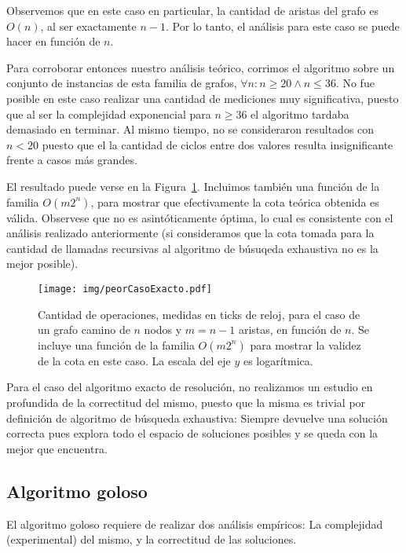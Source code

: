 Observemos que en este caso en particular, la cantidad de aristas del 
grafo es $O(n)$, al ser exactamente $n-1$. Por lo tanto, el an\'alisis
para este caso se puede hacer en funci\'on de $n$.

Para corroborar entonces nuestro an\'alisis te\'orico, corrimos el 
algoritmo sobre un conjunto de instancias de esta familia de grafos, 
$\forall n : n \geq 20 \wedge n \leq 36$.  
No fue posible en este caso realizar una cantidad de 
mediciones muy significativa, puesto que al ser la complejidad 
exponencial para $n \geq 36$ el algoritmo tardaba demasiado en terminar.
Al mismo tiempo, no se consideraron resultados con $n < 20$ puesto que 
el la cantidad de ciclos entre dos valores resulta insignificante 
frente a casos m\'as grandes.

El resultado puede verse en la Figura~\ref{fig::peorCasoExacto}. 
Incluimos tambi\'en una funci\'on de la familia $O(m2^n)$, para 
mostrar que efectivamente la cota te\'orica obtenida es v\'alida. 
Observese que no es asint\'oticamente \'optima, lo cual es consistente
con el an\'alisis realizado anteriormente (si consideramos que la 
cota tomada para la cantidad de llamadas recursivas al algoritmo de 
b\'usuqeda exhaustiva no es la mejor posible).

\begin{figure}[H]
	\caption{Cantidad de operaciones, medidas en ticks de reloj, 
	para el caso de un grafo camino de $n$ nodos y 
	$m = n-1$ aristas, en funci\'on de $n$. Se incluye una funci\'on
	de la familia $O(m2^n)$ para mostrar la validez de la cota en este caso.
	La escala del eje $y$ es logar\'itmica.}
	\label{fig::peorCasoExacto}
	\centering
	\texttt{[image: img/peorCasoExacto.pdf]}
\end{figure} 

Para el caso del algoritmo exacto de resoluci\'on, no realizamos un 
estudio en profundida de la correctitud del mismo, puesto que la misma
es trivial por definici\'on de algoritmo de b\'usqueda exhaustiva: 
Siempre devuelve una soluci\'on correcta pues explora todo el espacio 
de soluciones posibles y se queda con la mejor que encuentra.

\subsection{Algoritmo goloso}

El algoritmo goloso requiere de realizar dos an\'alisis emp\'iricos: 
La complejidad (experimental) del mismo, y la correctitud de las 
soluciones.

